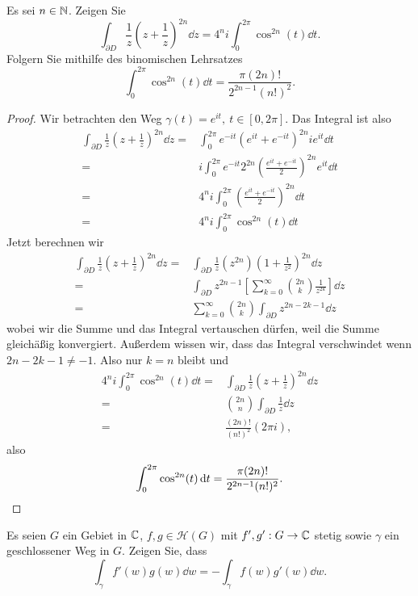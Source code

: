 \begin{Problem}
	Es sei $n\in \mathbb{N}$. Zeigen Sie
	\[
	\int_{\partial D}\frac{1}{z}\left( z+\frac{1}{z} \right)^{2n}\dd{z}=4^n i \int_0^{2\pi} \cos^{2n}(t) \dd{t}
	.\] 
	Folgern Sie mithilfe des binomischen Lehrsatzes
	\[
	\int_0^{2\pi} \cos^{2n}(t)\dd{t}=\frac{\pi(2n)!}{2^{2n-1}(n!)^2}
	.\] 
\end{Problem}
\begin{proof}
	Wir betrachten den Weg $\gamma(t)=e^{it},~t\in [0,2\pi]$. Das Integral ist also
	\begin{align*}
		\int_{\partial D}\frac{1}{z}\left( z+\frac{1}{z} \right)^{2n}\dd{z}=&\int_{0}^{2\pi}e^{-it}\left( e^{it}+e^{-it} \right)^{2n}ie^{it}\dd{t}\\
		=&i\int_{0}^{2\pi}e^{-it}2^{2n}\left( \frac{e^{it}+e^{-it}}{2} \right)^{2n}e^{it}\dd{t}\\
		=&4^n i \int_0^{2\pi} \left( \frac{e^{it}+e^{-it}}{2} \right)^{2n}\dd{t}\\
		=&4^n i \int_0^{2\pi} \cos^{2n}(t)\dd{t}
	\end{align*}
	Jetzt berechnen wir
	\begin{align*}
		\int_{\partial D}\frac{1}{z}\left( z+\frac{1}{z} \right)^{2n}\dd{z}=&\int_{\partial D} \frac{1}{z}(z^{2n})\left( 1+\frac{1}{z^2} \right)^{2n}\dd{z}\\
		=&\int_{\partial D} z^{2n-1}\left[ \sum_{k=0}^\infty \binom{2n}{k}\frac{1}{z^{2k}} \right] \dd{z}\\
		=& \sum_{k=0}^\infty\binom{2n}{k}\int_{\partial D} z^{2n-2k-1}\dd{z}
	\end{align*}
	wobei wir die Summe und das Integral vertauschen dürfen, weil die Summe gleichäßig konvergiert. Außerdem wissen wir, dass das Integral verschwindet wenn $2n-2k-1\neq -1$. Also nur $k=n$ bleibt und
	\begin{align*}
		4^n i \int_0^{2\pi} \cos^{2n}(t)\dd{t}=&\int_{\partial D}\frac{1}{z}\left( z+\frac{1}{z} \right)^{2n}\dd{z}\\
		=&\binom{2n}{n}\int_{\partial D}\frac{1}{z}\dd{z}\\
		=&\frac{(2n)!}{(n!)^2}(2\pi i),
	\end{align*}
	also
	\[
	\int_0^{2\pi} \cos^{2n}(t)\dd{t}=\frac{\pi(2n)!}{2^{2n-1}(n!)^2}
	.\qedhere\] 
\end{proof}
\begin{Problem}
	Es seien $G$ ein Gebiet in $\mathbb{C}$, $f,g\in \mathcal{H}(G)$ mit $f',g':G\to \mathbb{C}$ stetig sowie $\gamma$ ein geschlossener Weg in $G$. Zeigen Sie, dass
	\[
	\int_\gamma f'(w)g(w)\dd{w}=-\int_\gamma f(w)g'(w)\dd{w}
	.\] 
\end{Problem}
